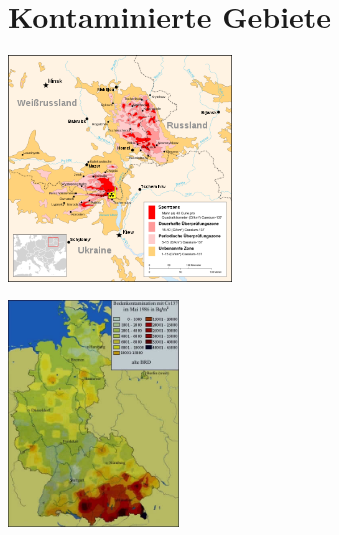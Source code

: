 \documentclass{beamer}
\begin{document}
\section{Kontaminierte Gebiete}
\begin{frame}{}
    \begin{center}
        \includegraphics[height=6.0cm]{img/Kontaminierte_gebiete_1.jpg}\\
        \begin{block}{}
        \end{block}
    \end{center}
\end{frame}

\begin{frame}{}
    \begin{center}
        \includegraphics[height=6.0cm]{img/Kontaminierte_gebiete_2.jpg}\\
        \begin{block}{}
        \end{block}
    \end{center}
\end{frame}
\end{document}
